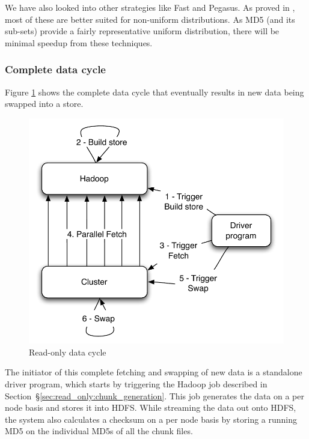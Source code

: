 We have also looked into other strategies like Fast and Pegasus. As
proved in \cite{manolopoulos}, most of these are better suited for
non-uniform distributions. As MD5 (and its sub-sets) provide a fairly 
representative uniform distribution, there will be minimal speedup 
from these techniques.


\subsubsection{Complete data cycle}
\label{sec:read_only:data_cycle}

Figure \ref{cycle} shows the complete data cycle that eventually
results in new data being swapped into a \projectname{} store. 

\begin{figure}
  \centering
    \includegraphics[scale=0.60]{images/cycle.pdf}
  \caption{Read-only data cycle}
  \label{cycle}
\end{figure}

The initiator of this complete fetching and swapping of new data is a
standalone driver program, which starts by triggering the Hadoop job
described in Section~\S\ref{sec:read_only:chunk_generation}. This job
generates the data on a per node basis and stores it into HDFS. While
streaming the data out onto HDFS, the system also calculates a
checksum on a per node basis by storing a running MD5 on the
individual MD5s of all the chunk files. 

